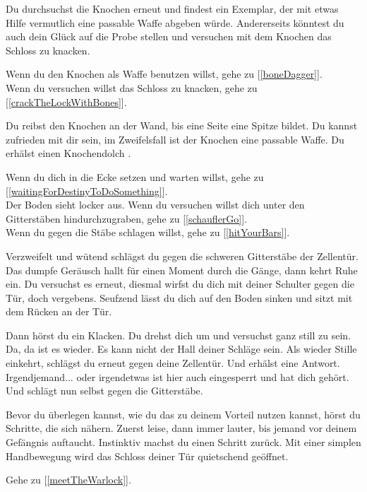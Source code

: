 Du durchsuchst die Knochen erneut und findest ein Exemplar, der mit etwas Hilfe vermutlich eine passable Waffe abgeben würde. Andererseits könntest du auch dein Glück auf die Probe stellen und versuchen mit dem Knochen das Schloss zu knacken.

Wenn du den Knochen als Waffe benutzen willst, gehe zu [\ref{boneDagger}].
\\Wenn du versuchen willst das Schloss zu knacken, gehe zu [\ref{crackTheLockWithBones}].


Du reibst den Knochen an der Wand, bis eine Seite eine Spitze bildet. Du kannst zufrieden mit dir sein, im Zweifelsfall ist der Knochen eine passable Waffe.
Du erhälst einen Knochendolch .

Wenn du dich in die Ecke setzen und warten willst, gehe zu [\ref{waitingForDestinyToDoSomething}].
\\Der Boden sieht locker aus. Wenn du versuchen willst dich unter den Gitterstäben hindurchzugraben, gehe zu [\ref{schauflerGo}].
\\Wenn du gegen die Stäbe schlagen willst, gehe zu [\ref{hitYourBars}].


Verzweifelt und wütend schlägst du gegen die schweren Gitterstäbe der Zellentür. Das dumpfe Geräusch hallt für einen Moment durch die Gänge, dann kehrt Ruhe ein. Du versuchst es erneut, diesmal wirfst du dich mit deiner Schulter gegen die Tür, doch vergebens. Seufzend lässt du dich auf den Boden sinken und sitzt mit dem Rücken an der Tür.

Dann hörst du ein Klacken. Du drehst dich um und versuchst ganz still zu sein. Da, da ist es wieder. Es kann nicht der Hall deiner Schläge sein. Als wieder Stille einkehrt, schlägst du erneut gegen deine Zellentür. Und erhälst eine Antwort. Irgendjemand... oder irgendetwas ist hier auch eingesperrt und hat dich gehört. Und schlägt nun selbst gegen die Gitterstäbe.

Bevor du überlegen kannst, wie du das zu deinem Vorteil nutzen kannst, hörst du Schritte, die sich nähern. Zuerst leise, dann immer lauter, bis jemand vor deinem Gefängnis auftaucht. Instinktiv machst du einen Schritt zurück. Mit einer simplen Handbewegung wird das Schloss deiner Tür quietschend geöffnet.

Gehe zu [\ref{meetTheWarlock}].


